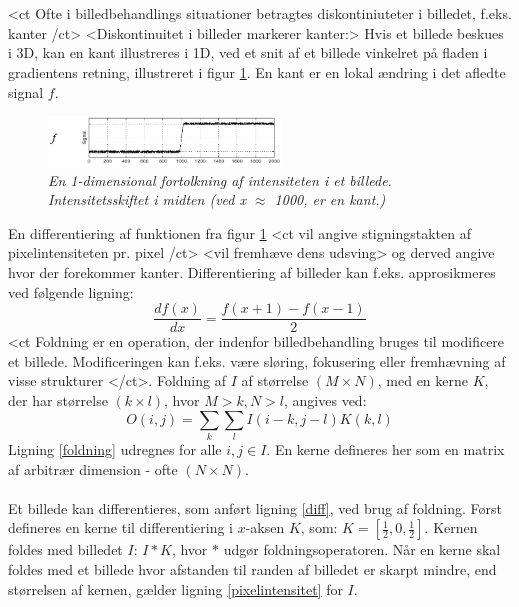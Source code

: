 \\
\\
<ct Ofte i billedbehandlings situationer betragtes diskontiniuteter i billedet, f.eks. kanter /ct>
<Diskontinuitet i billeder markerer kanter:> Hvis et billede beskues i 3D, kan en kant illustreres i 1D, ved et snit af et billede vinkelret på fladen i gradientens retning, illustreret i figur \ref{fig:kant}. En kant er en lokal ændring i det afledte signal $f$.
\noindent
\begin{figure}[H]
    \centering
    \includegraphics[width=0.55\textwidth]{fig/7.png}
     \vspace{-1em}
    \begin{center}        
     \caption{{\footnotesize \textit{
En 1-dimensional fortolkning af intensiteten i et billede. Intensitetsskiftet i midten (ved x $\approx$ 1000, er en kant.)}}}
    \label{fig:kant}
     \end{center}
       \vspace{-2.5em}
  \end{figure}
\noindent
En differentiering af funktionen fra figur \ref{fig:kant} <ct vil angive stigningstakten af pixelintensiteten pr. pixel /ct> <vil fremhæve dens udsving> og derved angive hvor der forekommer kanter. Differentiering af billeder kan f.eks. approsikmeres ved følgende ligning:
\begin{equation}
\dfrac{df(x)}{dx}=\dfrac{f(x+1)-f(x-1)}{2}
\label{diff}
\end{equation}
<ct Foldning er en operation, der indenfor billedbehandling bruges til modificere et billede. Modificeringen kan f.eks. være sløring, fokusering eller fremhævning af visse strukturer </ct>. Foldning af $I$ af størrelse $(M \times N)$, med en kerne $K$, der har størrelse $(k \times l)$, hvor $M > k, N > l$, angives ved:
\begin{equation}
O(i,j) = \sum_{k} \sum_{l} I(i-k, j-l) K(k,l)
\label{foldning}
\end{equation}
Ligning \eqref{foldning} udregnes for alle $i,j \in I$. En kerne defineres her som en matrix af arbitrær dimension - ofte $(N\times N)$. 
\\
\\
Et billede kan differentieres, som anført ligning \eqref{diff}, ved brug af foldning. Først defineres en kerne til differentiering i $x$-aksen $K$, som: $K = [\frac{1}{2}, 0, \frac{1}{2}]$. Kernen foldes med billedet $I$: $I \ast K $, hvor $\ast$ udgør foldningsoperatoren. Når en kerne skal foldes med et billede hvor afstanden til randen af billedet er skarpt mindre, end størrelsen af kernen, gælder ligning \eqref{pixelintensitet} for $I$.
